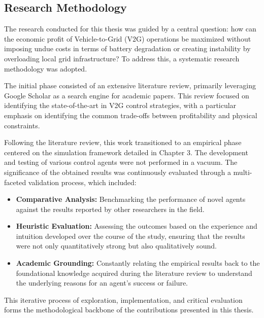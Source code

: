 \subsection{Research Methodology}
The research conducted for this thesis was guided by a central question: how can the economic profit of Vehicle-to-Grid (V2G) operations be maximized without imposing undue costs in terms of battery degradation or creating instability by overloading local grid infrastructure? To address this, a systematic research methodology was adopted.

The initial phase consisted of an extensive literature review, primarily leveraging Google Scholar as a search engine for academic papers. This review focused on identifying the state-of-the-art in V2G control strategies, with a particular emphasis on identifying the common trade-offs between profitability and physical constraints.

Following the literature review, this work transitioned to an empirical phase centered on the simulation framework detailed in Chapter 3. The development and testing of various control agents were not performed in a vacuum. The significance of the obtained results was continuously evaluated through a multi-faceted validation process, which included:
\begin{itemize}
    \item \textbf{Comparative Analysis:} Benchmarking the performance of novel agents against the results reported by other researchers in the field.
    \item \textbf{Heuristic Evaluation:} Assessing the outcomes based on the experience and intuition developed over the course of the study, ensuring that the results were not only quantitatively strong but also qualitatively sound.
    \item \textbf{Academic Grounding:} Constantly relating the empirical results back to the foundational knowledge acquired during the literature review to understand the underlying reasons for an agent's success or failure.
\end{itemize}
This iterative process of exploration, implementation, and critical evaluation forms the methodological backbone of the contributions presented in this thesis.


\newpage
